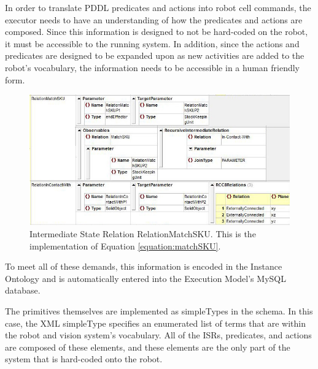 In order to translate PDDL predicates and actions into robot cell commands, 
the executor needs to have an
understanding of how the predicates and actions are composed. Since this information is
designed to not be hard-coded on the robot, it must be accessible to the running system.
In addition, since the actions and predicates are designed to be expanded upon as
new activities are added to the robot's vocabulary, the information needs to be
accessible in a human friendly form.
%
\begin{figure}[htb!]
\begin{center}
\includegraphics[width=12cm]{images/MatchSKU_ISR.jpg}
\caption{Intermediate State Relation RelationMatchSKU. This is the
implementation of Equation \ref{equation:matchSKU}.}
\label{fig:ISR}
\end{center}
\end{figure}
%
To meet all of these demands, this information is encoded in the Instance Ontology and is automatically entered into the Execution Model's MySQL database. 

The primitives themselves are implemented as simpleTypes in the schema.
In this case, the XML simpleType specifies an enumerated list of terms
that are within the robot and vision system's vocabulary. All of the
ISRs, predicates, and actions are composed of these elements, and these
elements are the only part of the system that is hard-coded onto the
robot.
